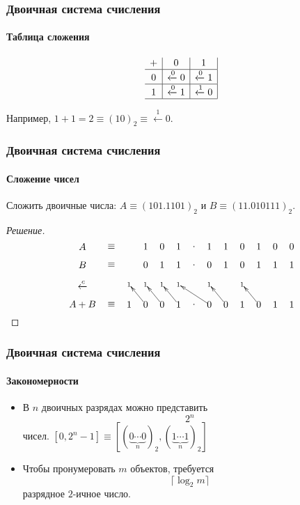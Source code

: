 \begin{frame}
    \frametitle{Двоичная система счисления}
    \framesubtitle{Таблица сложения}
    
    \[
        \begin{array}[c]{c|c|c|}
            + & 0 & 1 \\
            \hline
            0 & \xleftarrow{0}0 & \xleftarrow{0}1\\
            \hline
            1 & \xleftarrow{0}1 & \xleftarrow{1}0 \\
            \hline
        \end{array}
    \]
    
    Например, $1+1=2 \equiv (10)_2 \equiv \xleftarrow{1}0$.
\end{frame}

\begin{frame}
    \frametitle{Двоичная система счисления}
    \framesubtitle{Сложение чисел}
    
    \begin{example}[Задача]
        Сложить двоичные числа:
        $A\equiv(101.1101)_2$ и
        $B\equiv(11.010111)_2$.
    \end{example}
    \begin{proof}[Решение]
    \[
        {\entrymodifiers={}
            {\xymatrix@=1pc{
                A&\equiv
                    & &1&0&1&.&1&1&0&1&0&0\\
                B&\equiv
                    & &0&1&1&.&0&1&0&1&1&1\\
                \xleftarrow{c}
                 &  &_1&_1&_1&_1& &_1& &_1& & & \\
                A+B&\equiv
                    &1
                      &0\ar[ul]
                        &0\ar[ul]
                          &1\ar[ul]
                            &.
                              &0\ar[ull]
                                &0\ar[ul]
                                  &1
                                    &0\ar[ul]
                                      &1
                                        &1
            }}
        }
    \]
    \end{proof}
\end{frame}

\begin{frame}
    \frametitle{Двоичная система счисления}
    \framesubtitle{Закономерности}
    
    \begin{itemize}
        \item В $n$ двоичных разрядах можно представить 
        \[2^n\] 
        чисел. $[0,2^n-1] \equiv [(\underbrace{0\cdots 0}_n)_2,(\underbrace{1\cdots 1}_n)_2]$
        \item Чтобы пронумеровать $m$ объектов, требуется 
        \[\lceil\log_2m\rceil\]
        разрядное $2$-ичное число.
    \end{itemize}
\end{frame}

